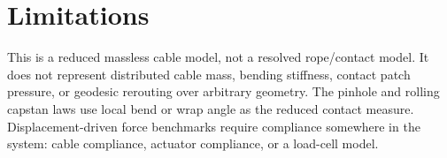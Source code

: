 \documentclass[11pt]{article}
\begin{document}
\section{Limitations}

This is a reduced massless cable model, not a resolved rope/contact model.  It
does not represent distributed cable mass, bending stiffness, contact patch
pressure, or geodesic rerouting over arbitrary geometry.  The pinhole and
rolling capstan laws use local bend or wrap angle as the reduced contact
measure.  Displacement-driven force benchmarks require compliance somewhere in
the system: cable compliance, actuator compliance, or a load-cell model.
\end{document}
